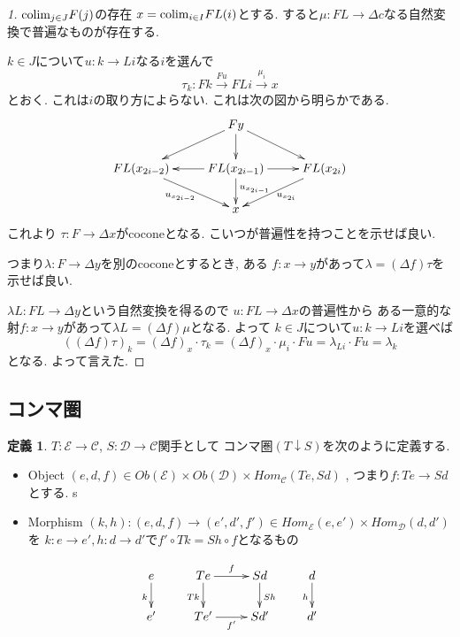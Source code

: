 \documentclass[dvipdfmx,a4paper,11pt]{report}
\newcommand{\colim}{{\rm colim}}
\theoremstyle{definition}
\newtheorem{dfn}[thm]{定義}
\begin{document}
\begin{proof}
[1]$\colim_{j \in J} F(j)$の存在
$x= \colim_{i\in I}FL(i)$とする.
すると$\mu : FL \to \Delta c$なる自然変換で普遍なものが存在する.

$k \in J$について$u : k \to Li$なる$i$を選んで
$$
\tau_k : Fk \overset{Fu}{\to} FLi \overset{\mu_{i}}{\to} x
$$
とおく. 
これは$i$の取り方によらない.
これは次の図から明らかである.
\begin{equation*}
\xymatrix@C=25pt@R=20pt{
& Fy\ar@{->}[ld]\ar@{->}[d]\ar@{->}[rd]
&
\\
FL(x_{2i-2})\ar@{->}[rd]_{u_{x_{2i-2}}}
&FL(x_{2i-1})\ar@{->}[l]\ar@{->}[r]\ar@{->}[d]^{u_{x_{2i-1}}}
&FL(x_{2i}) \ar@{->}[ld]^{u_{x_{2i}}}\\   
&x
& \\   
}
\end{equation*}
これより
$\tau : F \to \Delta x$がcoconeとなる.
こいつが普遍性を持つことを示せば良い.

つまり$\lambda : F \to \Delta y$を別のcoconeとするとき, ある
$f : x \to y$があって$\lambda = (\Delta f) \tau$を示せば良い.

$\lambda L : FL \to \Delta y$という自然変換を得るので
$u : FL \to \Delta x$の普遍性から
ある一意的な射$f : x \to y$があって$\lambda L = (\Delta f) \mu $となる.
よって
$k \in J$について$u : k \to Li$を選べば
$$
((\Delta f)\tau)_{k}
= 
(\Delta f)_{x}\cdot \tau_k
=
(\Delta f)_{x} \cdot \mu_{i} \cdot Fu
=\lambda_{Li}\cdot Fu
=\lambda _{k} 
$$
となる. 
よって言えた. 
\end{proof}


\subsection{コンマ圏}
 \begin{tcolorbox}
 [colback = white, colframe = green!35!black, fonttitle = \bfseries,breakable = true]
\begin{dfn}
$T :  \mathcal{E} \to \mathcal{C}$, $S : \mathcal{D} \to \mathcal{C}$関手として
コンマ圏$(T \downarrow S)$を次のように定義する. 
\begin{itemize}
\item Object $(e,d,f) \in Ob(\mathcal{E}) \times Ob(\mathcal{D}) \times Hom_{\mathcal{C}}(Te, Sd)$ , つまり$f : Te \to Sd$とする. s
\item Morphism $(k,h) : (e,d,f)  \to (e',d',f') \in Hom_{\mathcal{E}}(e,e') \times Hom_{\mathcal{D}}(d,d') $ を $k : e \to e', h: d \to d'$で$f' \circ Tk = Sh \circ f$となるもの
\end{itemize}

\begin{equation*}
\xymatrix@C=25pt@R=20pt{
e \ar@{->}[d] _{k}&Te\ar@{->}[d]_{Tk}  \ar@{->}[r]^{f} & Sd\ar@{->}[d]^{Sh} &d\ar@{->}[d]_{h}\\
e'&Te'\ar@{->}[r]_{f'} &Sd'&d' \\   
}
\end{equation*}
\end{dfn}
\end{tcolorbox}
\end{document}
